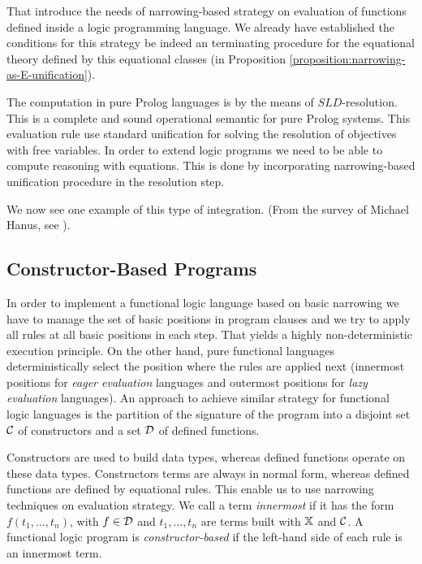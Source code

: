 That introduce the needs of narrowing-based strategy on evaluation of functions defined inside a logic programming language. We already have established the conditions for this strategy be indeed an terminating procedure for the equational theory defined by this equational classes (in Proposition \ref{proposition:narrowing-as-E-unification}).

The computation in pure Prolog languages is by the means of $SLD$-resolution. This is a complete and sound operational semantic for pure Prolog systems. This evaluation rule use standard unification for solving the resolution of objectives with free variables. In order to extend logic programs we need to be able to compute reasoning with equations. This is done by incorporating narrowing-based unification procedure in the resolution step.

We now see one example of this type of integration. (From the survey of Michael Hanus, see \cite{HANUS1994583}).

\subsection{Constructor-Based Programs}
In order to implement a functional logic language based on basic narrowing we have to manage the set of basic positions in program clauses and we try to apply all rules at all basic positions in each step. That yields a highly non-deterministic execution principle. On the other hand, pure functional languages deterministically select the position where the rules are applied next (innermost positions for \textit{eager evaluation} languages and outermost positions for \textit{lazy evaluation} languages). An approach to achieve similar strategy for functional logic languages is the partition of the signature of the program into a disjoint set $\mathcal{C}$ of constructors and a set $\mathcal{D}$ of defined functions.

Constructors are used to build data types, whereas defined functions operate on these data types. Constructors terms are always in normal form, whereas defined functions are defined by equational rules. This enable us to use narrowing techniques on evaluation strategy. We call a term \textit{innermost} if it has the form $f(t_1, \dots, t_n)$, with $f \in \mathcal{D}$ and $t_1, \dots, t_n$ are terms built with $\mathbb{X}$ and $\mathcal{C}$. A functional logic program is \textit{constructor-based} if the left-hand side of each rule is an innermost term.

